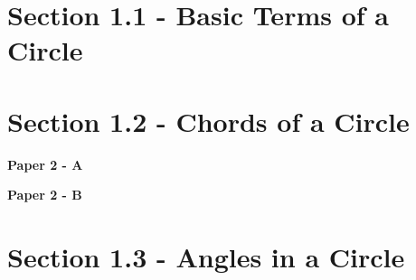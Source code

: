 \documentclass[12pt, a4paper]{article}
\begin{document}
\section*{Section 1.1 - Basic Terms of a Circle}\label{section:5-1-1}





\section*{Section 1.2 - Chords of a Circle}\label{section:5-1-2}

\textbf{Paper 2 - A}
\begin{enumx}[label=\arabic*.,start=1]
\item {}\label{DSE2012S-CoreP2-Q16} 
\item {}\label{DSE2014-CoreP2-Q21} 
\item {}\label{DSE2018-CoreP2-Q17} 
\end{enumx}
\textbf{Paper 2 - B}
\begin{enumx}[label=\arabic*.,start=4]
\item {}\label{DSE2012P-CoreP2-Q40} 
\end{enumx}




\section*{Section 1.3 - Angles in a Circle}\label{section:5-1-3}
\end{document}
